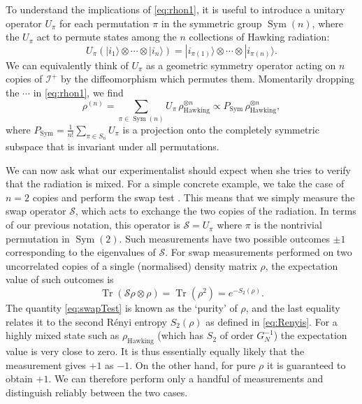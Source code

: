 \documentclass[letterpaper,12pt]{article}
\DeclareMathOperator{\Tr}{Tr}
\DeclareMathOperator{\Sym}{Sym}
\newcommand*{\scri}{\mathscr{I}} %
\newcommand*{\swap}{\mathcal{S}} %
\begin{document}
To understand the implications of \eqref{eq:rhon1}, it is useful to introduce a unitary operator $U_\pi$ for each permutation $\pi$ in the symmetric group $\Sym(n)$, where the $U_\pi$ act to permute states among the $n$ collections of Hawking radiation:
\begin{equation}
	U_\pi \left(|i_1\rangle\otimes\cdots\otimes |i_n\rangle\right) = |i_{\pi(1)}\rangle\otimes\cdots\otimes |i_{\pi(n)}\rangle.
\end{equation}
We can equivalently think of $U_\pi$ as a geometric symmetry operator acting on $n$ copies of $\scri^+$ by the diffeomorphism which permutes them.
Momentarily dropping the $\cdots$ in \eqref{eq:rhon1}, we find
\begin{equation}\label{eq:rhon2}
	\rho^{(n)} = \sum_{\pi\in \Sym(n)} U_\pi\, \rho_\text{Hawking}^{\otimes n}\propto P_\text{Sym}\, \rho_\text{Hawking}^{\otimes n},
\end{equation}
where $P_\text{Sym} = \frac{1}{n!}\sum_{\pi\in S_n} U_\pi$ is a projection onto the completely symmetric subspace that is invariant under all permutations.

We can now ask what our experimentalist should expect when she tries to verify that the radiation is mixed. For a simple concrete example, we take the case of $n=2$ copies and perform the swap test \cite{buhrman2001quantum,Hayden:2007cs}. This means that we simply measure the swap operator $\swap$, which acts to exchange the two copies of the radiation.  In terms of our previous notation, this operator is $\swap=U_\pi$ where $\pi$ is the nontrivial permutation in $\Sym(2)$.  Such measurements have two possible outcomes $\pm 1$ corresponding to the eigenvalues of $\swap$. For swap measurements performed on two uncorrelated copies of a single (normalised) density matrix $\rho$, the expectation value of such outcomes is
\begin{equation}\label{eq:swapTest}
	\Tr(\swap \rho\otimes \rho) = \Tr(\rho^2) = e^{-S_2(\rho)}.
\end{equation}
The quantity \eqref{eq:swapTest} is known as the `purity' of $\rho$, and the last equality relates it to the second R\'enyi entropy $S_2(\rho)$ as defined in \eqref{eq:Renyis}.  For a highly mixed state such as $\rho_\text{Hawking}$ (which has $S_2$ of order $G_N^{-1}$) the expectation value is very close to zero.  It is thus essentially equally likely that the measurement gives $+1$ as $-1$. On the other hand, for pure $\rho$ it is guaranteed to obtain $+1$. We can therefore perform only a handful of measurements and distinguish reliably between the two cases.
\end{document}
